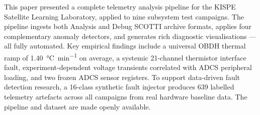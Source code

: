 \documentclass[conference]{IEEEtran}
\begin{document}
This paper presented a complete telemetry analysis pipeline for the
KISPE Satellite Learning Laboratory, applied to nine subsystem test
campaigns.  The pipeline ingests both Analysis and Debug SCOTTI archive
formats, applies four complementary anomaly detectors, and generates
rich diagnostic visualisations — all fully automated.  Key empirical
findings include a universal OBDH thermal ramp of
\SI{1.40}{\celsius\per\minute} on average, a systemic 21-channel
thermistor interface fault, experiment-dependent voltage transients
correlated with ADCS peripheral loading, and two frozen ADCS sensor
registers.  To support data-driven fault detection research, a
16-class synthetic fault injector produces 639 labelled telemetry
artefacts across all campaigns from real hardware baseline data.
The pipeline and dataset are made openly available.



\end{document}

